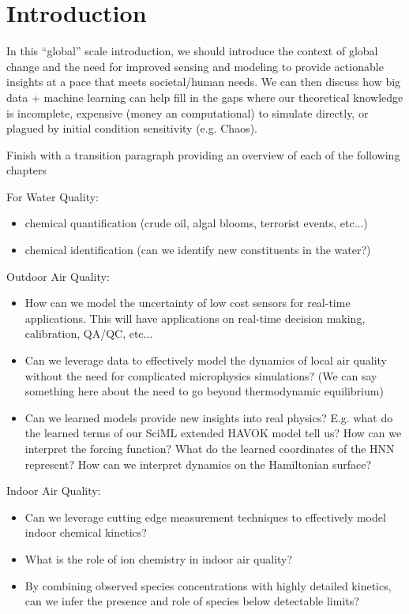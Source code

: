 \chapter{Introduction}
In this ``global'' scale introduction, we should introduce the context of global change and the need for improved sensing and modeling to provide actionable insights at a pace that meets societal/human needs. We can then discuss how big data + machine learning can help fill in the gaps where our theoretical knowledge is incomplete, expensive (money an computational) to simulate directly, or plagued by initial condition sensitivity (e.g. Chaos).

Finish with a transition paragraph providing an overview of each of the following chapters

For Water Quality:
\begin{itemize}
\item chemical quantification (crude oil, algal blooms, terrorist events, etc...)
\item chemical identification (can we identify new constituents in the water?)
\end{itemize}

Outdoor Air Quality:
\begin{itemize}
\item How can we model the uncertainty of low cost sensors for real-time applications. This will have applications on real-time decision making, calibration, QA/QC, etc...
\item Can we leverage data to effectively model the dynamics of local air quality without the need for complicated microphysics simulations? (We can say something here about the need to go beyond thermodynamic equilibrium)
\item Can we learned models provide new insights into real physics? E.g. what do the learned terms of our SciML extended HAVOK model tell us? How can we interpret the forcing function? What do the learned coordinates of the HNN represent? How can we interpret dynamics on the Hamiltonian surface?
\end{itemize}


Indoor Air Quality:
\begin{itemize}
\item Can we leverage cutting edge measurement techniques to effectively model indoor chemical kinetics?
\item What is the role of ion chemistry in indoor air quality?
\item By combining observed species concentrations with highly detailed kinetics, can we infer the presence and role of species below detectable limits?
\end{itemize}

